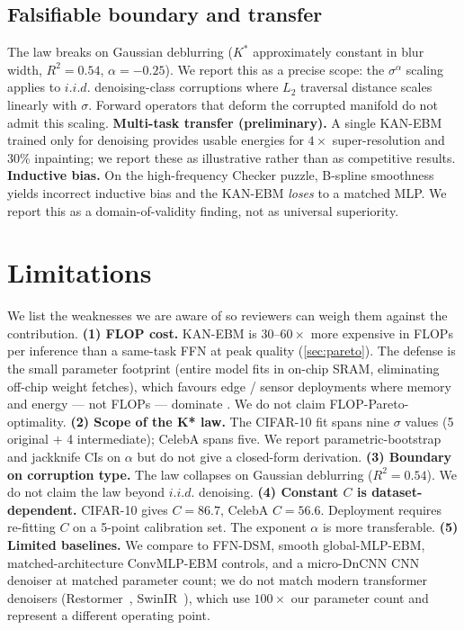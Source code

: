 \documentclass{article}
\begin{document}
\subsection{Falsifiable boundary and transfer}
The law breaks on Gaussian deblurring ($K^*$ approximately constant in blur width, $R^2{=}0.54$, $\alpha{=}-0.25$). We report this as a precise scope: the $\sigma^\alpha$ scaling applies to $i.i.d.$ denoising-class corruptions where $L_2$ traversal distance scales linearly with $\sigma$. Forward operators that deform the corrupted manifold do not admit this scaling. \textbf{Multi-task transfer (preliminary).} A single KAN-EBM trained only for denoising provides usable energies for $4\times$ super-resolution and 30\% inpainting; we report these as illustrative rather than as competitive results. \textbf{Inductive bias.} On the high-frequency Checker puzzle, B-spline smoothness yields incorrect inductive bias and the KAN-EBM \emph{loses} to a matched MLP. We report this as a domain-of-validity finding, not as universal superiority.

\section{Limitations}
\label{sec:limitations}
We list the weaknesses we are aware of so reviewers can weigh them against the contribution. \textbf{(1) FLOP cost.} KAN-EBM is $30$--$60{\times}$ more expensive in FLOPs per inference than a same-task FFN at peak quality (\cref{sec:pareto}). The defense is the small parameter footprint (entire model fits in on-chip SRAM, eliminating off-chip weight fetches), which favours edge / sensor deployments where memory and energy --- not FLOPs --- dominate \citep{horowitz2014energy}. We do not claim FLOP-Pareto-optimality. \textbf{(2) Scope of the K* law.} The CIFAR-10 fit spans nine $\sigma$ values (5 original $+$ 4 intermediate); CelebA spans five. We report parametric-bootstrap and jackknife CIs on $\alpha$ but do not give a closed-form derivation. \textbf{(3) Boundary on corruption type.} The law collapses on Gaussian deblurring ($R^2{=}0.54$). We do not claim the law beyond $i.i.d.$ denoising. \textbf{(4) Constant $C$ is dataset-dependent.} CIFAR-10 gives $C{=}86.7$, CelebA $C{=}56.6$. Deployment requires re-fitting $C$ on a 5-point calibration set. The exponent $\alpha$ is more transferable. \textbf{(5) Limited baselines.} We compare to FFN-DSM, smooth global-MLP-EBM, matched-architecture ConvMLP-EBM controls, and a micro-DnCNN CNN denoiser at matched parameter count; we do not match modern transformer denoisers (Restormer~\citep{zamir2022restormer}, SwinIR~\citep{liang2021swinir}), which use $100{\times}$ our parameter count and represent a different operating point.
\end{document}
